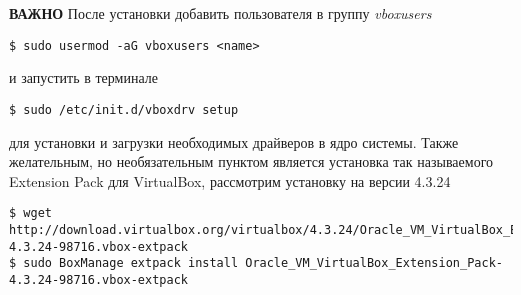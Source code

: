 \noindent\textbf{ВАЖНО} После установки добавить пользователя в группу \emph{vboxusers} \\
\begin{lstlisting}
$ sudo usermod -aG vboxusers <name>
\end{lstlisting}
и запустить в терминале
\begin{lstlisting}
$ sudo /etc/init.d/vboxdrv setup
\end{lstlisting}
для установки и загрузки необходимых драйверов в ядро системы. Также желательным, но необязательным пунктом 
является установка так называемого Extension Pack для VirtualBox, рассмотрим установку на версии 4.3.24
\begin{lstlisting}
$ wget http://download.virtualbox.org/virtualbox/4.3.24/Oracle_VM_VirtualBox_Extension_Pack-4.3.24-98716.vbox-extpack
$ sudo BoxManage extpack install Oracle_VM_VirtualBox_Extension_Pack-4.3.24-98716.vbox-extpack
\end{lstlisting}

